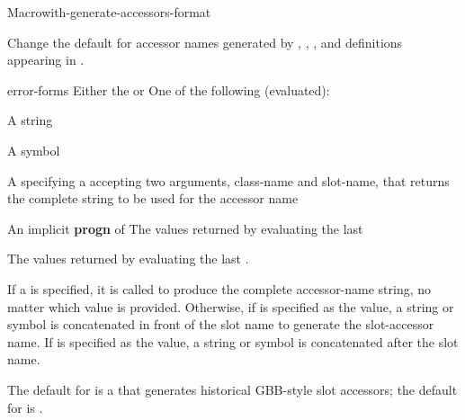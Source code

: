 \documentclass[10pt,twoside,english,pdftex]{article}
\begin{document}
\begin{functiondoc}{Macro}{with-generate-accessors-format}%
  {
    }

\fnsyntax

\fnpurpose Change the default for accessor names generated by
,
,
, and
 definitions appearing in
.

\fnpackage {}

\fnmodule {}

\fnargs
\begin{args}{error-forms}
\arg[format] Either the   or 
 One of the following (evaluated):
\begin{tightitemize}
\item A string 
\item A symbol
\item A  specifying a 
  accepting two arguments, class-name and slot-name, that returns the complete
  string to be used for the accessor name
\end{tightitemize}
\arg[forms] An implicit \textbf{progn} of 
\arg[results] The values returned by evaluating the last 
\end{args}

\fnreturns The values returned by evaluating the last .

\fndescription If a  
is specified, it is called to produce the complete accessor-name string, no
matter which  value is provided.  Otherwise, if
 is specified as the  value, a string or
symbol  is concatenated in front of the slot
name to generate the slot-accessor name.  If  is
specified as the  value, a string or symbol
 is concatenated after the slot name.

The default  for  is a
 that generates historical GBB-style
 slot accessors; the
default for  is .


\end{functiondoc}
\end{document}
